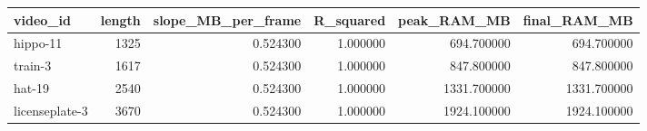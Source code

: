 \begin{tabular}{lrrrrr}
\toprule
video_id & length & slope_MB_per_frame & R_squared & peak_RAM_MB & final_RAM_MB \\
\midrule
hippo-11 & 1325 & 0.524300 & 1.000000 & 694.700000 & 694.700000 \\
train-3 & 1617 & 0.524300 & 1.000000 & 847.800000 & 847.800000 \\
hat-19 & 2540 & 0.524300 & 1.000000 & 1331.700000 & 1331.700000 \\
licenseplate-3 & 3670 & 0.524300 & 1.000000 & 1924.100000 & 1924.100000 \\
\bottomrule
\end{tabular}
